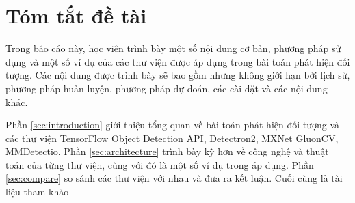 \section{Tóm tắt đề tài}
\label{summary}

Trong báo cáo này, học viên trình bày một số nội dung cơ bản, phương pháp sử dụng và một số ví dụ của các thư viện được áp dụng trong bài toán phát hiện đối tượng. Các nội dung được trình bày sẽ bao gồm nhưng không giới hạn bởi lịch sử, phương pháp huấn luyện, phương pháp dự đoán, các cài đặt và các nội dung khác.

Phần \ref{sec:introduction} giới thiệu tổng quan về bài toán phát hiện đối tượng và các thư viện TensorFlow Object Detection API, Detectron2, MXNet GluonCV, MMDetectio. Phần \ref{sec:architecture} trình bày kỹ hơn về công nghệ và thuật toán của từng thư viện, cùng với đó là một số ví dụ trong áp dụng. Phần \ref{sec:compare} so sánh các thư viện với nhau và đưa ra kết luận. Cuối cùng là tài liệu tham khảo